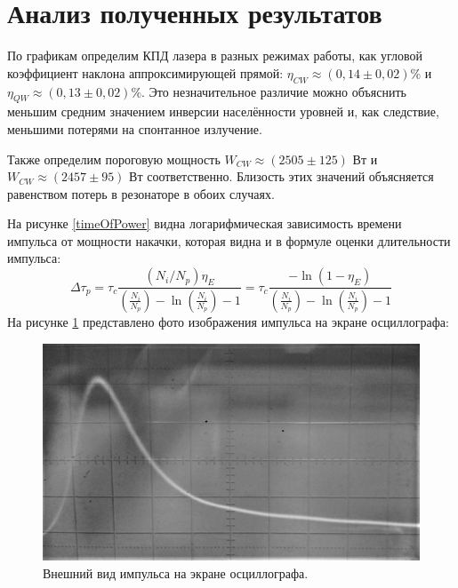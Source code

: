 \documentclass[a4paper, 12pt]{article}
\begin{document}
\section{Анализ полученных результатов}
По графикам определим КПД лазера в разных режимах работы, как угловой коэффициент наклона аппроксимирующей прямой:
$ \eta_{CW} \approx (0,14 \pm 0,02)\% $ и 
$ \eta_{QW} \approx (0,13 \pm 0,02)\% $. Это незначительное различие можно объяснить меньшим средним значением инверсии населённости уровней и, как следствие, меньшими потерями на спонтанное излучение.

Также определим пороговую мощность 
$ W_{CW} \approx (2505 \pm 125) $ Вт и 
$ W_{CW} \approx (2457 \pm 95) $ Вт соответственно. Близость этих значений объясняется равенством потерь в резонаторе в обоих случаях.

На рисунке \ref{timeOfPower} видна логарифмическая зависимость времени импульса от мощности накачки, которая видна и в формуле оценки длительности импульса:
\begin{equation}
	\Delta\tau_p=\tau_c\frac{(N_i/N_p)\eta_E}{\left(\frac{N_i}{N_p}\right)-\ln\left(\frac{N_i}{N_p}\right)-1}=\tau_c\frac{-\ln(1-\eta_E)}{\left(\frac{N_i}{N_p}\right)-\ln\left(\frac{N_i}{N_p}\right)-1}
\end{equation}
На рисунке \ref{impulse} представлено фото изображения импульса на экране осциллографа:
\begin{figure}[h]
	\centering
	\includegraphics[scale=0.5]{impuls}
	\caption{Внешний вид импульса на экране осциллографа.}
	\label{impulse}
\end{figure}
\end{document}
